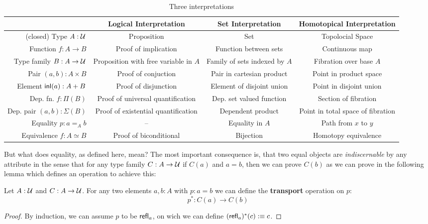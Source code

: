 \begin{sidewaystable}
{\small
\begin{tabular}{r|ccc}
  & Logical Interpretation & Set Interpretation & Homotopical Interpretation \\
\hline
(closed) Type $A : \mathcal{U}$
  & Proposition
  & Set
  & Topolocial Space \\
Function $f : A \to B$
  & Proof of implication
  & Function between sets
  & Continuous map \\
Type family $B : A \to \mathcal{U}$
  & Proposition with free variable in $A$
  & Family of sets indexed by $A$
  & Fibration over base $A$ \\
Pair $(a, b) : A \times B$
  & Proof of conjuction
  & Pair in cartesian product
  & Point in product space \\
Element $\mathsf{inl}(a) : A + B$
  & Proof of disjunction
  & Element of disjoint union
  & Point in disjoint union \\
Dep. fn. $f : \Pi(B)$
  & Proof of universal quantification
  & Dep. set valued function
  & Section of fibration \\
Dep. pair $(a, b) : \Sigma(B)$
  & Proof of existential quantification
  & Dependent product
  & Point in total space of fibration \\
Equality $p : a =_A b$
  & --
  & Equality in $A$
  & Path from $x$ to $y$ \\
Equivalence $f : A \simeq B$
  & Proof of biconditional
  & Bijection
  & Homotopy equivalence
\end{tabular}}
\caption{Three interpretations}\label{tbl:tt-hott}
\end{sidewaystable}

But what does equality, as defined here, mean?
The most important consequence is, that two equal objects are \emph{indiscernable}
by any attribute in the sense that for any type family $C : A \to \mathcal{U}$ if
$C(a)$ and $a = b$, then we can prove $C(b)$ as we can prove in the following
lemma which defines an operation to achieve this:
\begin{lemma}[Transport]
Let $A : \mathcal{U}$ and $C : A \to \mathcal{U}$.
For any two elements $a, b : A$ with $p : a = b$ we can define the
\textbf{transport} operation on $p$:
\begin{equation*}
p^* : C(a) \to C(b)
\end{equation*}
\end{lemma}

\begin{proof}
By induction, we can assume $p$ to be $\mathsf{refl}_a$, on wich we can define
$(\mathsf{refl}_a)^*(c) :\equiv c$.
\end{proof}

